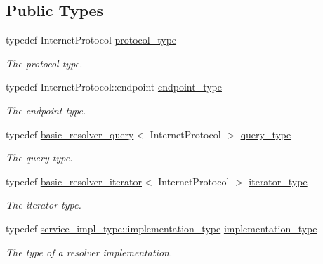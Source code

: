 \subsection*{Public Types}
\begin{DoxyCompactItemize}
\item 
typedef Internet\+Protocol \hyperlink{classasio_1_1ip_1_1resolver__service_a69654a63222789b8c363f3054ff01fa6}{protocol\+\_\+type}
\begin{DoxyCompactList}\small\item\em The protocol type. \end{DoxyCompactList}\item 
typedef Internet\+Protocol\+::endpoint \hyperlink{classasio_1_1ip_1_1resolver__service_aa51d73a98d9f6a1df7ca69a419fa7bc3}{endpoint\+\_\+type}
\begin{DoxyCompactList}\small\item\em The endpoint type. \end{DoxyCompactList}\item 
typedef \hyperlink{classasio_1_1ip_1_1basic__resolver__query}{basic\+\_\+resolver\+\_\+query}$<$ Internet\+Protocol $>$ \hyperlink{classasio_1_1ip_1_1resolver__service_a60008f0c960687605c978dff14011145}{query\+\_\+type}
\begin{DoxyCompactList}\small\item\em The query type. \end{DoxyCompactList}\item 
typedef \hyperlink{classasio_1_1ip_1_1basic__resolver__iterator}{basic\+\_\+resolver\+\_\+iterator}$<$ Internet\+Protocol $>$ \hyperlink{classasio_1_1ip_1_1resolver__service_a7b71bd80a7d9296ac334251bed0e2b4c}{iterator\+\_\+type}
\begin{DoxyCompactList}\small\item\em The iterator type. \end{DoxyCompactList}\item 
typedef \hyperlink{classasio_1_1detail_1_1resolver__service_a9b39aff4ee39b0f45731ec01d9f5fd74}{service\+\_\+impl\+\_\+type\+::implementation\+\_\+type} \hyperlink{classasio_1_1ip_1_1resolver__service_aa686664be9b5626ca662d4603ae3459b}{implementation\+\_\+type}
\begin{DoxyCompactList}\small\item\em The type of a resolver implementation. \end{DoxyCompactList}\end{DoxyCompactItemize}
